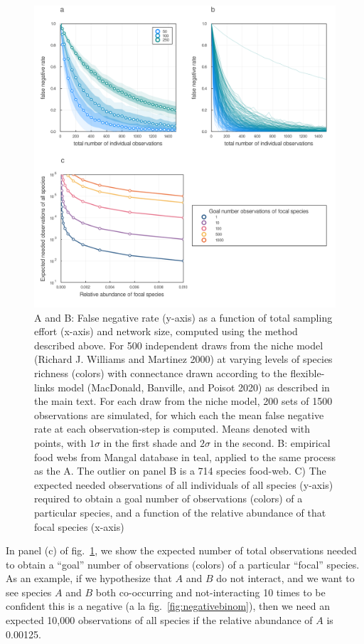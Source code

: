 \documentclass[11pt]{article}
\makeatletter
\def\maxwidth{\ifdim\Gin@nat@width>\linewidth\linewidth
\else\Gin@nat@width\fi}
\let\Oldincludegraphics\includegraphics
\renewcommand{\includegraphics}[1]{\Oldincludegraphics[width=\maxwidth]{#1}}
\makeatother
\begin{document}
\begin{figure}
\hypertarget{fig:totalobs}{%
\centering
\includegraphics{./figures/combinedfig2.png}
\caption{A and B: False negative rate (y-axis) as a function of total
sampling effort (x-axis) and network size, computed using the method
described above. For 500 independent draws from the niche model (Richard
J. Williams and Martinez 2000) at varying levels of species richness
(colors) with connectance drawn according to the flexible-links model
(MacDonald, Banville, and Poisot 2020) as described in the main text.
For each draw from the niche model, 200 sets of 1500 observations are
simulated, for which each the mean false negative rate at each
observation-step is computed. Means denoted with points, with
\(1\sigma\) in the first shade and \(2\sigma\) in the second. B:
empirical food webs from Mangal database in teal, applied to the same
process as the A. The outlier on panel B is a 714 species food-web. C)
The expected needed observations of all individuals of all species
(y-axis) required to obtain a goal number of observations (colors) of a
particular species, and a function of the relative abundance of that
focal species (x-axis)}\label{fig:totalobs}
}
\end{figure}

In panel (c) of fig.~\ref{fig:totalobs}, we show the expected number of
total observations needed to obtain a ``goal'' number of observations
(colors) of a particular ``focal'' species. As an example, if we
hypothesize that \(A\) and \(B\) do not interact, and we want to see
species \(A\) and \(B\) both co-occurring and not-interacting 10 times
to be confident this is a negative (a la fig.~\ref{fig:negativebinom}),
then we need an expected 10,000 observations of all species if the
relative abundance of \(A\) is 0.00125.
\end{document}
